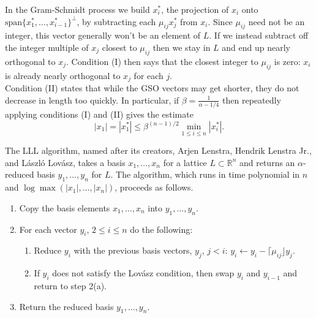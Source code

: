\documentclass[11pt,letterpaper]{article}
\newcommand{\reals}{\mathbb{R}}
\theoremstyle{definition}
\begin{document}

\noindent In the Gram-Schmidt process we build $x_i^*$, the projection of $x_i$ onto $\text{span}\{x_1^*, \ldots, x_{i-1}^*\}^\perp$, by subtracting each $\mu_{ij}x_j^*$ from $x_i$. Since $\mu_{ij}$ need not be an integer, this vector generally won't be an element of $L$. If we instead subtract off the integer multiple of $x_j$ closest to $\mu_{ij}$ then we stay in $L$ and end up nearly orthogonal to $x_j$. Condition (I) then says that the closest integer to $\mu_{ij}$ is zero: $x_i$ is already nearly orthogonal to $x_j$ for each $j$.\\

\noindent Condition (II) states that while the GSO vectors may get shorter, they do not decrease in length too quickly. In particular, if $\beta = \frac{1}{\alpha-1/4}$ then repeatedly applying conditions (I) and (II) gives the estimate
\[
|x_1| = |x_1^*| \leq \beta^{(n-1)/2}\min_{1\leq i\leq n}|x_i^*|.
\]


\noindent The LLL algorithm, named after its creators, Arjen Lenstra, Hendrik Lenstra Jr., and L\'aszl\'o Lov\'asz, takes a basis $x_1, \ldots, x_n$ for a lattice $L\subset \reals^n$ and returns an $\alpha$-reduced basis $y_1, \ldots, y_n$ for $L$. The algorithm, which runs in time polynomial in $n$ and $\log \max(|x_1|, \ldots, |x_n|)$, proceeds as follows.
\begin{enumerate}
	\item Copy the basis elements $x_1, \ldots, x_n$ into $y_1, \ldots, y_n$.
	\item For each vector $y_i$, $2\leq i \leq n$ do the following:
	\begin{enumerate}
		\item Reduce $y_i$ with the previous basis vectors, $y_j$, $j<i$: $y_i \gets y_i - \lceil \mu_{ij}\rfloor y_j$.
		\item If $y_i$ does not satisfy the Lov\'asz condition, then swap $y_i$ and $y_{i-1}$ and return to step 2(a).
	\end{enumerate}
	\item Return the reduced basis $y_1, \ldots, y_n$.
\end{enumerate}
\end{document}
